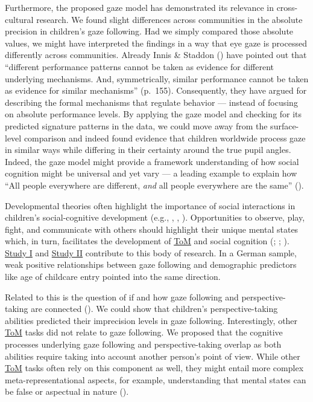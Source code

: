 \documentclass[
]{scrbook}
\begin{document}
Furthermore, the proposed gaze model has demonstrated its relevance in cross-cultural research. We found slight differences across communities in the absolute precision in children's gaze following. Had we simply compared those absolute values, we might have interpreted the findings in a way that eye gaze is processed differently across communities. Already Innis \& Staddon () have pointed out that ``different performance patterns cannot be taken as evidence for different underlying mechanisms. And, symmetrically, similar performance cannot be taken as evidence for similar mechanisms'' (p.~155). Consequently, they have argued for describing the formal mechanisms that regulate behavior --- instead of focusing on absolute performance levels. By applying the gaze model and checking for its predicted signature patterns in the data, we could move away from the surface-level comparison and indeed found evidence that children worldwide process gaze in similar ways while differing in their certainty around the true pupil angles. Indeed, the gaze model might provide a framework understanding of how social cognition might be universal and yet vary --- a leading example to explain how ``All people everywhere are different, \emph{and} all people everywhere are the same'' ().

Developmental theories often highlight the importance of social interactions in children's social-cognitive development (e.g., , , ). Opportunities to observe, play, fight, and communicate with others should highlight their unique mental states which, in turn, facilitates the development of \hyperref[acronyms_ToM]{ToM} and social cognition (; ; ). \hyperref[studyI]{Study I} and \hyperref[studyII]{Study II} contribute to this body of research. In a German sample, weak positive relationships between gaze following and demographic predictors like age of childcare entry pointed into the same direction.

Related to this is the question of if and how gaze following and perspective-taking are connected (). We could show that children's perspective-taking abilities predicted their imprecision levels in gaze following. Interestingly, other \hyperref[acronyms_ToM]{ToM} tasks did not relate to gaze following. We proposed that the cognitive processes underlying gaze following and perspective-taking overlap as both abilities require taking into account another person's point of view. While other \hyperref[acronyms_ToM]{ToM} tasks often rely on this component as well, they might entail more complex meta-representational aspects, for example, understanding that mental states can be false or aspectual in nature ().
\end{document}

